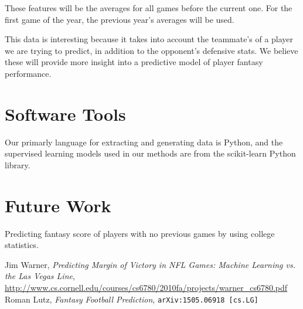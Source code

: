 \documentclass[11pt,a4paper]{article}
\begin{document}
These features will be the averages for all games before the current one. For the first game of the year, the previous year’s averages will be used.

This data is interesting because it takes into account the teammate’s of a player we are trying to predict, in addition to the opponent’s defensive stats. We believe these will provide more insight into a predictive model of player fantasy performance.

\section{Software Tools}
Our primarly language for extracting and generating data is Python, and the supervised learning models used in our methods are from the scikit-learn Python library. 

\section{Future Work}
Predicting fantasy score of players with no previous games by using college statistics.

\begin{thebibliography}{1}

  Jim Warner,
  \emph{Predicting Margin of Victory in NFL Games: Machine Learning vs. the Las Vegas Line},
  \url{http://www.cs.cornell.edu/courses/cs6780/2010fa/projects/warner_cs6780.pdf}
  Roman Lutz,
  \emph{Fantasy Football Prediction},
  {\tt arXiv:1505.06918 [cs.LG]}
\end{thebibliography}

\end{document}
